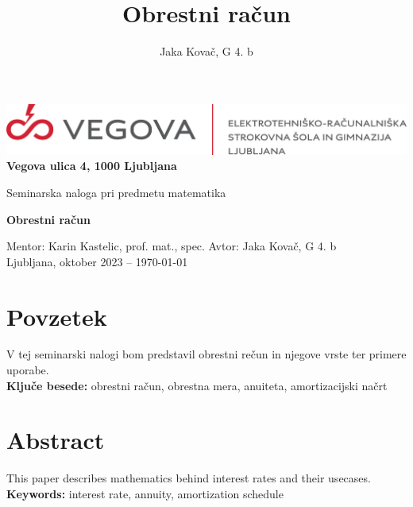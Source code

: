 \documentclass[12pt]{article}
\title{Obrestni račun}
\author{Jaka Kovač, G 4. b}
\begin{document}

\begin{center}
    \thispagestyle{empty}
    \includegraphics[scale=1]{slike/logotip_vegova_leze_brezokvirja.png}
    \\
    \textbf{Vegova ulica 4, 1000 Ljubljana}

    \vspace{\fill} 
    Seminarska naloga pri predmetu matematika

    \Huge{\textbf{Obrestni račun}}

    \normalsize
    \vspace{\fill}

    Mentor: Karin Kastelic, prof. mat., spec. \hfill Avtor: Jaka Kovač, G 4. b\\
    \null
    Ljubljana, oktober 2023 – \MMYYYYdate\today 
\end{center}
\newpage
\thispagestyle{empty}
\null
\newpage

\section*{Povzetek}
V tej seminarski nalogi bom predstavil obrestni rečun in njegove vrste ter primere uporabe.
\\ %
\textbf{Ključe besede:} obrestni račun, obrestna mera, anuiteta, amortizacijski načrt

\vfill
\section*{Abstract}
\foreignlanguage{english}{This paper describes mathematics behind interest rates and their usecases.
\\ %
\textbf{Keywords:} interest rate, annuity, amortization schedule}
\vfill

\newpage
\thispagestyle{empty} %
\tableofcontents %

\end{document}
